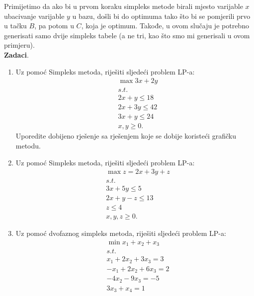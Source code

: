 \documentclass[a4paper, utf8, 11pt, colorlinks]{book}
\begin{document}
Primijetimo da ako bi u prvom koraku simpleks metode birali mjesto varijable $x$ ubacivanje varijable $y$ u bazu, došli bi do optimuma tako što bi se pomjerili   prvo u tačku $B$, pa potom u $C$, koja je optimum. Takođe, u ovom slučaju je potrebno generisati samo dvije simpleks tabele (a ne tri, kao što smo mi generisali u ovom primjeru).\vspace{1cm}
\\
\textbf{\Large Zadaci}.
\begin{enumerate}
 \item Uz pomoć Simpleks metoda, riješiti sljedeći problem LP-a:%
 \begin{align*}
 	 &\max  3x + 2y \\
 	 & s.t. \\
 	 & 2x + y \leq 18 \\
 	 & 2x + 3y \leq 42 \\
 	 & 3x + y \leq 24 \\
 	 & x,y \geq 0.
 \end{align*} 
Uporedite dobijeno rješenje sa rješenjem koje se dobije 
koristeći grafičku metodu.
\item %
   Uz pomoć Simpleks metoda, riješiti sljedeći problem LP-a:
 \begin{align*}
 	  &\max z = 2x + 3y + z \\
 	  & s.t. \\
 	  & 3x + 5 y \leq 5 \\
 	  & 2x + y - z \leq 13 \\
 	  & z \leq 4 \\
 	  & x,y,z \geq 0.
 \end{align*}
\item Uz pomoć dvofaznog simpleks metoda, riješiti sljedeći problem LP-a:%
   \begin{align*}
   	    &\min  x_1 + x_2 + x_3 \\
   	    & s.t. \\
   	    & x_1 + 2 x_2 + 3 x_3 = 3 \\
   	    & -x_1 + 2 x_2 + 6 x_3 = 2 \\
   	    & - 4x_2 - 9 x_3 = -5 \\
   	    & 3 x_3 + x_4 = 1 \\

\end{align*}
\end{enumerate}
\end{document}
